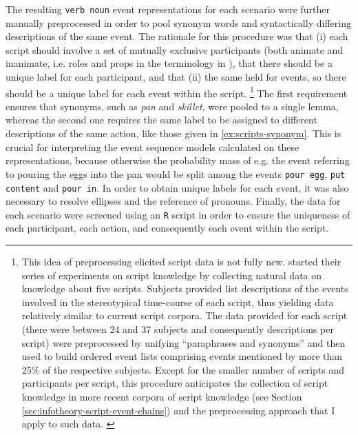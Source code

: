 The resulting \texttt{verb noun} event representations for each scenario were further manually preprocessed in order to pool synonym words and syntactically differing descriptions of the same event. The rationale for this procedure was that (i) each script should involve a set of mutually exclusive participants (both animate and inanimate, i.e. roles and props in the terminology in \citet{schank.abelson1977}), that there should be a unique label for each participant, and that (ii) the same held for events, so there should be a unique label for each event within the script.%
%
\footnote{This idea of preprocessing elicited script data is not fully new. \citet{bower.etal1979} started their series of experiments on script knowledge by collecting natural data on knowledge about five scripts. Subjects provided list descriptions of the events involved in the stereotypical time-course of each script, thus yielding data relatively similar to current script corpora. The data provided for each script (there were between 24 and 37 subjects and consequently descriptions per script) were preprocessed by unifying ``paraphrases and synonyms'' \citep[181]{bower.etal1979} and then used to build ordered event lists comprising events mentioned by more than 25\% of the respective subjects. Except for the smaller number of scripts and participants per script, this procedure anticipates the collection of script knowledge in more recent corpora of script knowledge (see Section \ref{sec:infotheory-script-event-chains}) and the preprocessing approach that I apply to such data.%
\label{fn:bower-etal-ex1}}\afterfn%
%
The first requirement ensures that synonyms, such as \textit{pan} and \textit{skillet}, were pooled to a single lemma, whereas the second one requires the same label to be assigned to different descriptions of the same action, like those given in \ref{ex:scripts-synonym}. This is crucial for interpreting the event sequence models calculated on these representations, because otherwise the probability mass of e.g. the event referring to pouring the eggs into the pan would be split among the events \texttt{pour egg}, \texttt{put content} and \texttt{pour in}. In order to obtain unique labels for each event, it was also necessary to resolve ellipses and the reference of pronouns. Finally, the data for each scenario were screened using an \texttt{R} script in order to ensure the uniqueness of each participant, each action, and consequently each event within the script.

